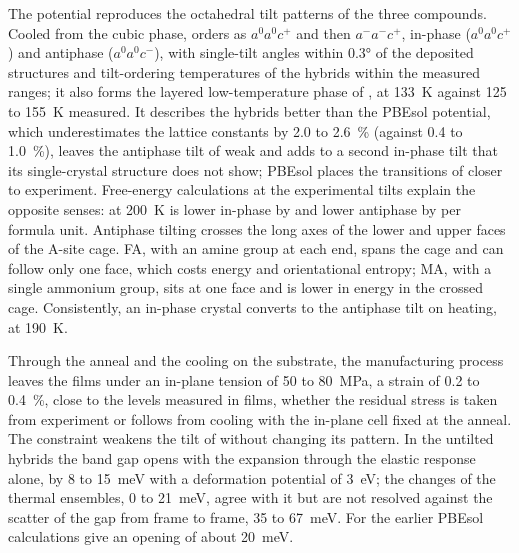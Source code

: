 {The \rSCAN{} potential reproduces the octahedral tilt patterns of the three compounds. Cooled from the cubic phase,
\CsSnI{} orders as $a^0a^0c^+$ and then $a^-a^-c^+$, \FASnI{} in-phase ($a^0a^0c^+$) and \MASnI{} antiphase
($a^0a^0c^-$), with single-tilt angles within \ang{0.3} of the deposited structures and tilt-ordering temperatures of
the hybrids within the measured ranges; it also forms the layered low-temperature phase of \FASnI{}, at
\SI{133}{K} against 125 to \SI{155}{K} measured.  It describes the hybrids better than the PBEsol potential, which underestimates
the lattice constants by 2.0 to \SI{2.6}{\percent} (against 0.4 to \SI{1.0}{\percent}), leaves the antiphase tilt of
\MASnI{} weak and adds to \FASnI{} a second in-phase tilt that its single-crystal structure does not show; PBEsol places the transitions of
\CsSnI{} closer to experiment. Free-energy calculations at the experimental tilts explain the opposite senses: at
\SI{200}{K} \FASnI{} is lower in-phase by  and \MASnI{} lower antiphase by
 per formula unit. Antiphase tilting crosses the long axes of the lower and upper
faces of the A-site cage. FA, with an amine group at each end, spans the cage and can follow only one face, which costs
energy and orientational entropy; MA, with a single ammonium group, sits at one face and is lower in energy in the
crossed cage. Consistently, an in-phase \MASnI{} crystal converts to the antiphase tilt on heating, at \SI{190}{K}.

Through the anneal and the cooling on the substrate, the manufacturing process leaves the films under an in-plane
tension of 50 to \SI{80}{MPa}, a strain of 0.2 to \SI{0.4}{\percent}, close to the levels measured in films, whether
the residual stress is taken from experiment or follows from cooling with the in-plane cell fixed at the anneal. The
constraint weakens the tilt of \CsSnI{} without changing its pattern. In the untilted hybrids the band gap opens with the expansion through
the elastic response alone, by 8 to \SI{15}{meV} with a deformation potential of \SI{3}{eV}; the changes of the thermal
ensembles, 0 to \SI{21}{meV}, agree with it but are not resolved against the scatter of the gap from frame to frame, 35
to \SI{67}{meV}. For \CsSnI{} the earlier PBEsol calculations give an opening of about \SI{20}{meV}.

}
